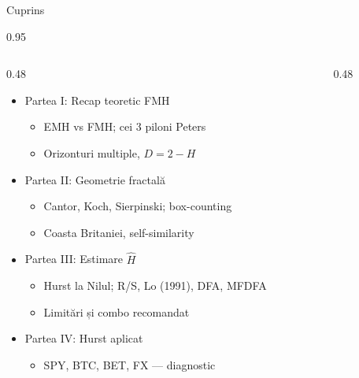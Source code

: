\documentclass[9pt, aspectratio=169, t]{beamer}
\subtitle{Seminar FMH --- Ipoteza Pieței Fractale (Fractal Market Hypothesis)}
\begin{document}
{
\begin{frame}
    \titlepage
\end{frame}
}

\begin{frame}[shrink=15]{Cuprins}
\begin{cminipage}{0.95\textwidth}
\begin{columns}[T]
\begin{column}{0.48\textwidth}
\begin{itemize}\setlength{\itemsep}{0pt}
    \item Partea I: Recap teoretic FMH
    \begin{itemize}\setlength{\itemsep}{0pt}
        \item EMH vs FMH; cei 3 piloni Peters
        \item Orizonturi multiple, $D=2-H$
    \end{itemize}
    \item Partea II: Geometrie fractală
    \begin{itemize}\setlength{\itemsep}{0pt}
        \item Cantor, Koch, Sierpinski; box-counting
        \item Coasta Britaniei, self-similarity
    \end{itemize}
    \item Partea III: Estimare $\hat H$
    \begin{itemize}\setlength{\itemsep}{0pt}
        \item Hurst la Nilul; R/S, Lo (1991), DFA, MFDFA
        \item Limitări și combo recomandat
    \end{itemize}
    \item Partea IV: Hurst aplicat
    \begin{itemize}\setlength{\itemsep}{0pt}
        \item SPY, BTC, BET, FX --- diagnostic
    \end{itemize}
\end{itemize}
\end{column}
\begin{column}{0.48\textwidth}

\end{column}
\end{columns}
\end{cminipage}
\end{frame}
\end{document}
